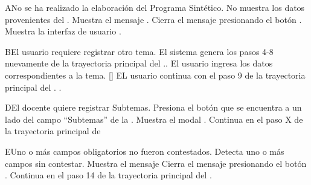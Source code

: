 
\begin{UCtrayectoriaA}{A}{No se ha realizado la elaboración del Programa Sintético.}
	\UCpaso No muestra los datos provenientes del .
	\UCpaso Muestra el mensaje .
	\UCpaso[\UCactor] Cierra el mensaje presionando el botón .
	\UCpaso Muestra la interfaz de usuario .
\end{UCtrayectoriaA}



\begin{UCtrayectoriaA}{B}{El usuario requiere registrar otro tema.}
	\UCpaso El sistema genera los pasos 4-8 nuevamente de la trayectoria principal del ..
    \UCpaso[\UCactor] El usuario ingresa los datos correspondientes a la tema.
    \UCpaso{}[\UCactor] EL usuario continua con el paso 9 de la trayectoria principal del .
    .
\end{UCtrayectoriaA}


\begin{UCtrayectoriaA}{D}{El docente quiere registrar Subtemas.}
	\UCpaso[\UCactor] Presiona el botón \BtnModal que se encuentra a un lado del campo ``Subtemas'' de la .
	\UCpaso Muestra el modal .
	\UCpaso Continua en el paso X de la trayectoria principal de 
\end{UCtrayectoriaA}


\begin{UCtrayectoriaA}{E}{Uno o más campos obligatorios no fueron contestados.}
	\UCpaso Detecta uno o más campos sin contestar.
    \UCpaso Muestra el mensaje 
    \UCpaso[\UCactor] Cierra el mensaje presionando el botón .
    \UCpaso Continua en el paso 14 de la trayectoria principal del .
\end{UCtrayectoriaA}

